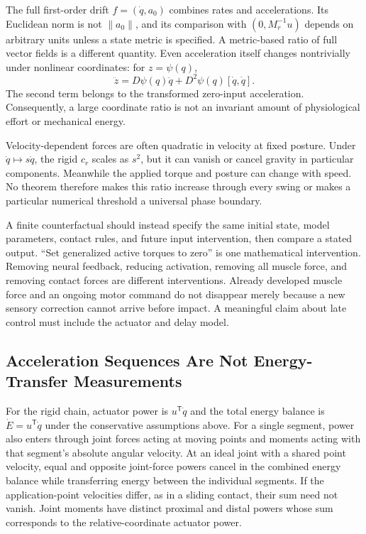 The full first-order drift $f=(\dot q,a_0)$ combines rates and accelerations. Its Euclidean norm is not $\|a_0\|$, and its comparison with $(0,M_r^{-1}u)$ depends on arbitrary units unless a state metric is specified. A metric-based ratio of full vector fields is a different quantity. Even acceleration itself changes nontrivially under nonlinear coordinates: for $z=\psi(q)$,
\begin{equation}
 \ddot z=D\psi(q)\ddot q+D^2\psi(q)[\dot q,\dot q].
\end{equation}
The second term belongs to the transformed zero-input acceleration. Consequently, a large coordinate ratio is not an invariant amount of physiological effort or mechanical energy.

Velocity-dependent forces are often quadratic in velocity at fixed posture. Under $\dot q\mapsto s\dot q$, the rigid $c_r$ scales as $s^2$, but it can vanish or cancel gravity in particular components. Meanwhile the applied torque and posture can change with speed. No theorem therefore makes this ratio increase through every swing or makes a particular numerical threshold a universal phase boundary.

A finite counterfactual should instead specify the same initial state, model parameters, contact rules, and future input intervention, then compare a stated output. ``Set generalized active torques to zero'' is one mathematical intervention. Removing neural feedback, reducing activation, removing all muscle force, and removing contact forces are different interventions. Already developed muscle force and an ongoing motor command do not disappear merely because a new sensory correction cannot arrive before impact. A meaningful claim about late control must include the actuator and delay model.

\subsection{Acceleration Sequences Are Not Energy-Transfer Measurements}

For the rigid chain, actuator power is $u^{\mathsf T}\dot q$ and the total energy balance is $\dot E=u^{\mathsf T}\dot q$ under the conservative assumptions above. For a single segment, power also enters through joint forces acting at moving points and moments acting with that segment's absolute angular velocity. At an ideal joint with a shared point velocity, equal and opposite joint-force powers cancel in the combined energy balance while transferring energy between the individual segments. If the application-point velocities differ, as in a sliding contact, their sum need not vanish. Joint moments have distinct proximal and distal powers whose sum corresponds to the relative-coordinate actuator power.

